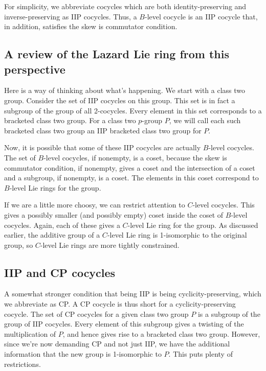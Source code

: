 \documentclass[10pt]{amsart}
\begin{document}
For simplicity, we abbreviate cocycles which are both
identity-preserving and inverse-preserving as IIP cocycles. Thus, a
$B$-level cocycle is an IIP cocycle that, in addition, satisfies the
skew is commutator condition.

\subsection{A review of the Lazard Lie ring from this perspective}

Here is a way of thinking about what's happening. We start with a
class two group. Consider the set of IIP cocycles on this group. This
set is in fact a subgroup of the group of all 2-cocycles. Every element
in this set corresponds to a bracketed class two group. For a class
two $p$-group $P$, we will call each such bracketed class two group an
IIP bracketed class two group for $P$.

Now, it is possible that some of these IIP cocycles are actually
$B$-level cocycles. The set of $B$-level cocycles, if nonempty, is a
coset, because the skew is commutator condition, if nonempty, gives a
coset and the intersection of a coset and a subgroup, if nonempty, is
a coset. The elements in this coset correspond to $B$-level Lie rings
for the group.

If we are a little more choosy, we can restrict attention to $C$-level
cocycles. This gives a possibly smaller (and possibly empty) coset
inside the coset of $B$-level cocycles. Again, each of these gives a
$C$-level Lie ring for the group. As discussed earlier, the additive
group of a $C$-level Lie ring is 1-isomorphic to the original group,
so $C$-level Lie rings are more tightly constrained.

\subsection{IIP and CP cocycles}

A somewhat stronger condition that being IIP is being
cyclicity-preserving, which we abbreviate as CP. A CP cocycle is thus
short for a cyclicity-preserving cocycle. The set of CP cocycles for a
given class two group $P$ is a subgroup of the group of IIP
cocycles. Every element of this subgroup gives a twisting of the
multiplication of $P$, and hence gives rise to a bracketed class two
group. However, since we're now demanding CP and not just IIP, we have
the additional information that the new group is 1-isomorphic to
$P$. This puts plenty of restrictions.
\end{document}
